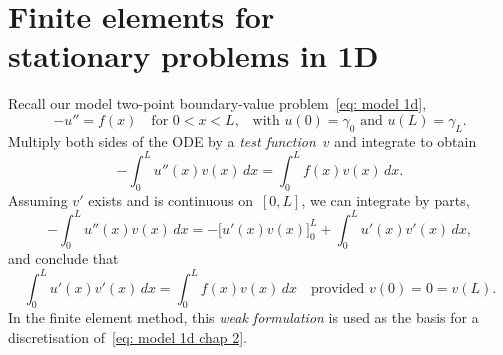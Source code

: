 \chapter[Finite elements in 1D]{Finite elements for \\
stationary problems in 1D}\label{chap: FEM 1d}

Recall our model two-point boundary-value problem~\eqref{eq: model 1d}, 
\begin{equation}\label{eq: model 1d chap 2}
-u''=f(x)\quad\text{for $0<x<L$,}
	\quad\text{with $u(0)=\gamma_0$ and $u(L)=\gamma_L$.}
\end{equation}
Multiply both sides of the ODE by a \emph{test function}~$v$ and integrate to 
obtain
\[
-\int_0^L u''(x)v(x)\,dx=\int_0^L f(x)v(x)\,dx.
\]
Assuming $v'$ exists and is continuous on~$[0,L]$, we can integrate by parts,
\begin{equation}\label{eq: int by parts}
-\int_0^L u''(x)v(x)\,dx=-\bigl[u'(x)v(x)\bigr]_0^L+\int_0^Lu'(x)v'(x)\,dx,
\end{equation}
and conclude that
\begin{equation}\label{eq: model 1d weak}
\int_0^L u'(x)v'(x)\,dx=\int_0^L f(x)v(x)\,dx
	\quad\text{provided $v(0)=0=v(L)$.}
\end{equation}
In the finite element method, this \emph{weak formulation} 
is used as the basis for a discretisation of~\eqref{eq: model 1d chap 2}.


